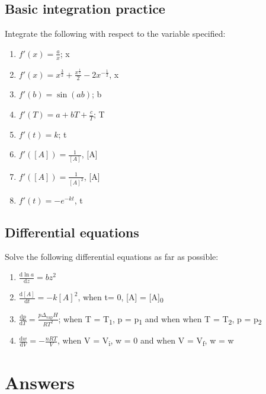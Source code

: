 \documentclass[
]{book}
\providecommand{\tightlist}{%
  \setlength{\itemsep}{0pt}\setlength{\parskip}{0pt}}
\begin{document}
\hypertarget{basic-integration-practice}{%
\subsection{Basic integration practice}\label{basic-integration-practice}}

Integrate the following with respect to the variable specified:

\begin{enumerate}
\def\labelenumi{\arabic{enumi}.}
\tightlist
\item
  \(f'(x) = \frac{a}{x}\); x
\item
  \(f'(x) = x^\frac{3}{2}+ \frac{x^\frac{1}{2}}{2} - 2x^{-\frac{1}{2}}\), x
\item
  \(f'(b) = \sin (ab)\); b
\item
  \(f'(T) = a + bT + \frac{c}{T}\); T
\item
  \(f'(t) = k\); t
\item
  \(f'([A]) = \frac{1}{[A]}\), {[}A{]}
\item
  \(f'([A]) = \frac{1}{[A]^2}\), {[}A{]}
\item
  \(f'(t) = -e^{-kt}\), t
\end{enumerate}

\hypertarget{differential-equations}{%
\subsection{Differential equations}\label{differential-equations}}

Solve the following differential equations as far as possible:

\begin{enumerate}
\def\labelenumi{\arabic{enumi}.}
\tightlist
\item
  \(\frac{\textrm{d}\ln a}{\textrm{d}z}= bz^2\)
\item
  \(\frac{\textrm{d}[A]}{\textrm{d}t} = -k[A]^2\), when t= 0, {[}A{]} = {[}A{]}\textsubscript{0}
\item
  \(\frac{\textrm{d}p}{\textrm{d}T}=\frac{p\Delta_{\textrm{vap}}H}{RT^2}\); when T = T\textsubscript{1}, p = p\textsubscript{1} and when when T = T\textsubscript{2}, p = p\textsubscript{2}
\item
  \(\frac{\textrm{d}w}{\textrm{d}V}= -\frac{nRT}{V}\), when V = V\textsubscript{i}, w = 0 and when V = V\textsubscript{f}, w = w
\end{enumerate}

\hypertarget{sec:Answers6}{%
\section{Answers}\label{sec:Answers6}}
\end{document}
